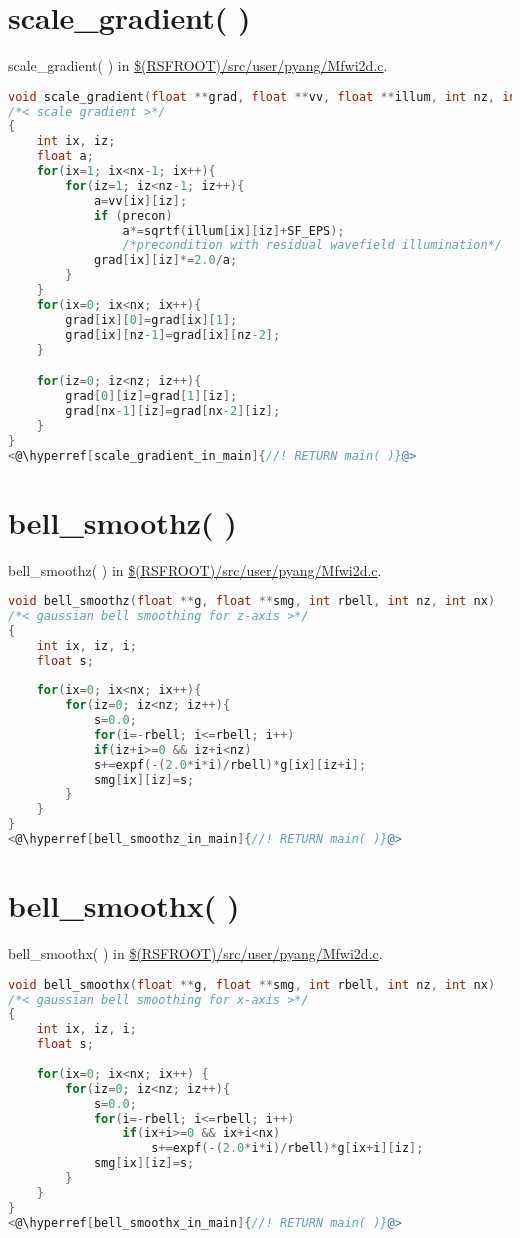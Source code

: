 \documentclass[a4paper,11pt]{article}
\theoremstyle{mytheor}
\begin{document}
\section*{scale\_gradient( )}
scale\_gradient( ) in \url{$(RSFROOT)/src/user/pyang/Mfwi2d.c}.
\begin{lstlisting}[label={scale_gradient},language=C,tabsize=4,caption=scale\_gradient( )]
void scale_gradient(float **grad, float **vv, float **illum, int nz, int nx, bool precon)
/*< scale gradient >*/
{
	int ix, iz;
	float a;
	for(ix=1; ix<nx-1; ix++){
		for(iz=1; iz<nz-1; iz++){
			a=vv[ix][iz];
			if (precon) 
				a*=sqrtf(illum[ix][iz]+SF_EPS);
				/*precondition with residual wavefield illumination*/
			grad[ix][iz]*=2.0/a;
		}
	}
	for(ix=0; ix<nx; ix++){
		grad[ix][0]=grad[ix][1];
		grad[ix][nz-1]=grad[ix][nz-2];
	}

	for(iz=0; iz<nz; iz++){
		grad[0][iz]=grad[1][iz];
		grad[nx-1][iz]=grad[nx-2][iz];
	}
}
<@\hyperref[scale_gradient_in_main]{//! RETURN main( )}@>
\end{lstlisting}

\section*{bell\_smoothz( )}
bell\_smoothz( ) in \url{$(RSFROOT)/src/user/pyang/Mfwi2d.c}.
\begin{lstlisting}[label={bell_smoothz},language=C,tabsize=4,caption=bell\_smoothz( )]
void bell_smoothz(float **g, float **smg, int rbell, int nz, int nx)
/*< gaussian bell smoothing for z-axis >*/
{
	int ix, iz, i;
	float s;
	
	for(ix=0; ix<nx; ix++){
		for(iz=0; iz<nz; iz++){
			s=0.0;
			for(i=-rbell; i<=rbell; i++)
			if(iz+i>=0 && iz+i<nz) 
			s+=expf(-(2.0*i*i)/rbell)*g[ix][iz+i];
			smg[ix][iz]=s;		
		}
	}
}
<@\hyperref[bell_smoothz_in_main]{//! RETURN main( )}@>
\end{lstlisting}

\section*{bell\_smoothx( )}
bell\_smoothx( ) in \url{$(RSFROOT)/src/user/pyang/Mfwi2d.c}.
\begin{lstlisting}[label={bell_smoothx},language=C,tabsize=4,caption=bell\_smoothx( )]
void bell_smoothx(float **g, float **smg, int rbell, int nz, int nx)
/*< gaussian bell smoothing for x-axis >*/
{
	int ix, iz, i;
	float s;
	
	for(ix=0; ix<nx; ix++) {
		for(iz=0; iz<nz; iz++){
			s=0.0;
			for(i=-rbell; i<=rbell; i++) 
				if(ix+i>=0 && ix+i<nx) 
					s+=expf(-(2.0*i*i)/rbell)*g[ix+i][iz];
			smg[ix][iz]=s;			
		}
	}
}
<@\hyperref[bell_smoothx_in_main]{//! RETURN main( )}@>
\end{lstlisting}
\end{document}
